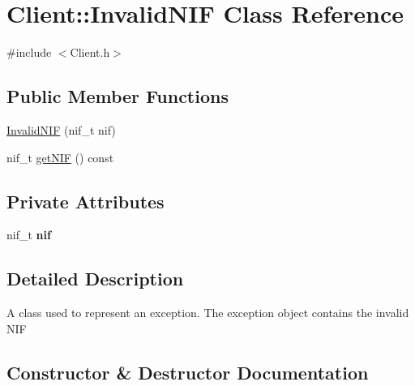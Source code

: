 \hypertarget{class_client_1_1_invalid_n_i_f}{}\section{Client\+:\+:Invalid\+N\+IF Class Reference}
\label{class_client_1_1_invalid_n_i_f}


{\ttfamily \#include $<$Client.\+h$>$}

\subsection*{Public Member Functions}
\begin{DoxyCompactItemize}
\item 
\hyperlink{class_client_1_1_invalid_n_i_f_adf33d79fc972ac7166b3419b2d5ec3a4}{Invalid\+N\+IF} (nif\+\_\+t nif)
\item 
nif\+\_\+t \hyperlink{class_client_1_1_invalid_n_i_f_a9ce8fd030fcd6ea099d40e3c53495684}{get\+N\+IF} () const
\end{DoxyCompactItemize}
\subsection*{Private Attributes}
\begin{DoxyCompactItemize}
\item 
\mbox{\label{class_client_1_1_invalid_n_i_f_a0a7ebd4f8a57925d65d1de7f1a9b5e84}} 
nif\+\_\+t {\bfseries nif}
\end{DoxyCompactItemize}


\subsection{Detailed Description}
A class used to represent an exception. The exception object contains the invalid N\+IF 

\subsection{Constructor \& Destructor Documentation}
\mbox{\label{class_client_1_1_invalid_n_i_f_adf33d79fc972ac7166b3419b2d5ec3a4}} 
